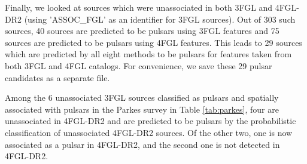 Finally, we looked at sources which were unassociated in both 3FGL and 4FGL-DR2 (using 'ASSOC\_FGL' as an identifier for 3FGL sources). Out of 303 such sources, 40 sources are predicted to be pulsars using 3FGL features and 75 sources are predicted to be pulsars using 4FGL features. This leads to 29 sources which are predicted by all eight methods to be pulsars for features taken from both 3FGL and 4FGL catalogs. 
For convenience, we save these 29 pulsar candidates as a separate file.

Among the 6 unassociated 3FGL sources classified as pulsars and spatially associated with pulsars in the Parkes survey in Table \ref{tab:parkes}, four are unassociated in 4FGL-DR2 and are predicted to be pulsars by the probabilistic classification of unassociated 4FGL-DR2 sources. Of the other two, one is now associated as a pulsar in 4FGL-DR2, and the second one is not detected in 4FGL-DR2. 



